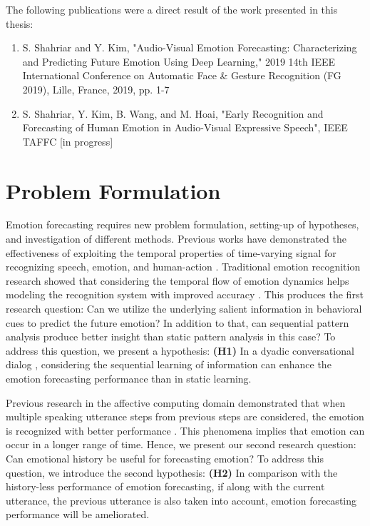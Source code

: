 The following publications were a direct result of the work presented in this thesis:
\begin{enumerate}
\item S. Shahriar and Y. Kim, "Audio-Visual Emotion Forecasting: Characterizing and Predicting Future Emotion Using Deep Learning," 2019 14th IEEE International Conference on Automatic Face \& Gesture Recognition (FG 2019), Lille, France, 2019, pp. 1-7
\item S. Shahriar, Y. Kim, B. Wang, and M. Hoai, "Early Recognition and Forecasting of Human Emotion in Audio-Visual Expressive Speech", IEEE TAFFC [in progress]
 
\end{enumerate}

\newpage
\section{Problem Formulation}
Emotion forecasting requires new problem formulation, setting-up of hypotheses, and investigation of different methods. Previous works have demonstrated the effectiveness of exploiting the temporal properties of time-varying signal for recognizing speech, emotion, and human-action \cite{speech_rec,baltru,action}. Traditional emotion recognition research showed that considering the temporal flow of emotion dynamics helps modeling the recognition system with improved accuracy \cite{kim_icassp_2013,Meta}.
This produces the first research question: Can we utilize the underlying salient information in behavioral cues to predict the future emotion? In addition to that, can sequential pattern analysis produce better insight than static pattern analysis in this case? To address this question, we present a hypothesis: \textbf{(H1)} In a dyadic conversational dialog , considering the sequential learning of information can enhance the emotion forecasting performance than in static learning. 

Previous research in the affective computing domain demonstrated that when multiple speaking utterance steps from previous steps are considered, the emotion is recognized with better performance \cite{Meta2}. This phenomena implies that emotion can occur in a longer range of time. Hence, we present our second research question: Can emotional history be useful for forecasting emotion? To address this question, we introduce the second hypothesis: \textbf{(H2)} In comparison with the history-less performance of emotion forecasting, if along with the current utterance, the previous utterance is also taken into account, emotion forecasting performance will be ameliorated.


